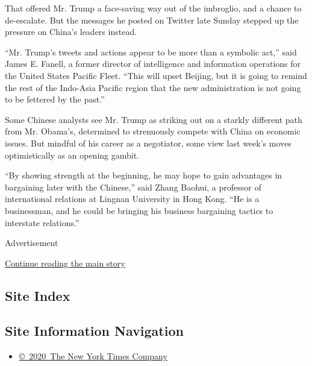 That offered Mr. Trump a face-saving way out of the imbroglio, and a
chance to de-escalate. But the messages he posted on Twitter late Sunday
stepped up the pressure on China's leaders instead.

``Mr. Trump's tweets and actions appear to be more than a symbolic
act,'' said James E. Fanell, a former director of intelligence and
information operations for the United States Pacific Fleet. ``This will
upset Beijing, but it is going to remind the rest of the Indo-Asia
Pacific region that the new administration is not going to be fettered
by the past.''

Some Chinese analysts see Mr. Trump as striking out on a starkly
different path from Mr. Obama's, determined to strenuously compete with
China on economic issues. But mindful of his career as a negotiator,
some view last week's moves optimistically as an opening gambit.

``By showing strength at the beginning, he may hope to gain advantages
in bargaining later with the Chinese,'' said Zhang Baohui, a professor
of international relations at Lingnan University in Hong Kong. ``He is a
businessman, and he could be bringing his business bargaining tactics to
interstate relations.''

Advertisement

\protect\hyperlink{after-bottom}{Continue reading the main story}

\hypertarget{site-index}{%
\subsection{Site Index}\label{site-index}}

\hypertarget{site-information-navigation}{%
\subsection{Site Information
Navigation}\label{site-information-navigation}}

\begin{itemize}
\tightlist
\item
  \href{https://help.nytimes.com/hc/en-us/articles/115014792127-Copyright-notice}{©~2020~The
  New York Times Company}
\end{itemize}

